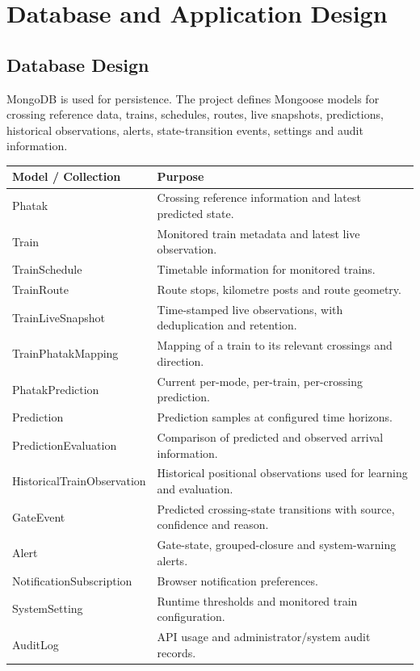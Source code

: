 \documentclass[11pt,a4paper]{report}
\begin{document}
\chapter{Database and Application Design}
\section{Database Design}
MongoDB is used for persistence. The project defines Mongoose models for crossing reference data, trains, schedules, routes, live snapshots, predictions, historical observations, alerts, state-transition events, settings and audit information.

\begin{longtable}{p{4.0cm}p{9.5cm}}
\toprule
\textbf{Model / Collection} & \textbf{Purpose}\\
\midrule
Phatak & Crossing reference information and latest predicted state.\\
Train & Monitored train metadata and latest live observation.\\
TrainSchedule & Timetable information for monitored trains.\\
TrainRoute & Route stops, kilometre posts and route geometry.\\
TrainLiveSnapshot & Time-stamped live observations, with deduplication and retention.\\
TrainPhatakMapping & Mapping of a train to its relevant crossings and direction.\\
PhatakPrediction & Current per-mode, per-train, per-crossing prediction.\\
Prediction & Prediction samples at configured time horizons.\\
PredictionEvaluation & Comparison of predicted and observed arrival information.\\
HistoricalTrainObservation & Historical positional observations used for learning and evaluation.\\
GateEvent & Predicted crossing-state transitions with source, confidence and reason.\\
Alert & Gate-state, grouped-closure and system-warning alerts.\\
NotificationSubscription & Browser notification preferences.\\
SystemSetting & Runtime thresholds and monitored train configuration.\\
AuditLog & API usage and administrator/system audit records.\\
\bottomrule
\end{longtable}
\end{document}
